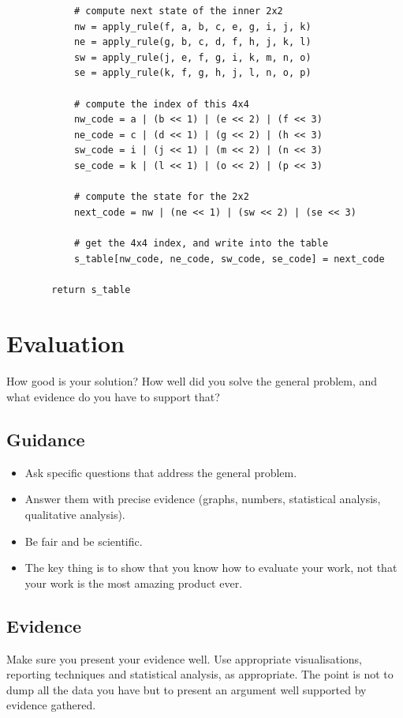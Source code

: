 \documentclass{l4proj}
\begin{document}
{\begin{lstlisting}
            # compute next state of the inner 2x2
            nw = apply_rule(f, a, b, c, e, g, i, j, k)
            ne = apply_rule(g, b, c, d, f, h, j, k, l)
            sw = apply_rule(j, e, f, g, i, k, m, n, o)
            se = apply_rule(k, f, g, h, j, l, n, o, p)

            # compute the index of this 4x4
            nw_code = a | (b << 1) | (e << 2) | (f << 3)
            ne_code = c | (d << 1) | (g << 2) | (h << 3)
            sw_code = i | (j << 1) | (m << 2) | (n << 3)
            se_code = k | (l << 1) | (o << 2) | (p << 3)

            # compute the state for the 2x2
            next_code = nw | (ne << 1) | (sw << 2) | (se << 3)

            # get the 4x4 index, and write into the table
            s_table[nw_code, ne_code, sw_code, se_code] = next_code

        return s_table

\end{lstlisting}

\chapter{Evaluation} 
How good is your solution? How well did you solve the general problem, and what evidence do you have to support that?

\section{Guidance}
\begin{itemize}
    \item
        Ask specific questions that address the general problem.
    \item
        Answer them with precise evidence (graphs, numbers, statistical
        analysis, qualitative analysis).
    \item
        Be fair and be scientific.
    \item
        The key thing is to show that you know how to evaluate your work, not
        that your work is the most amazing product ever.
\end{itemize}

\section{Evidence}
Make sure you present your evidence well. Use appropriate visualisations, 
reporting techniques and statistical analysis, as appropriate. The point is not
to dump all the data you have but to present an argument well supported by evidence gathered.

}
\end{document}
